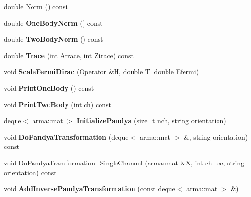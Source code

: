 \begin{DoxyCompactItemize}
\item 
double \hyperlink{classOperator_acb9d7959232a636191b91f6bf5b7b0c8}{Norm} () const 
\item 
double {\bfseries One\+Body\+Norm} () const \hypertarget{classOperator_a72dc7aea85c7775097d235de6f17f330}{}\label{classOperator_a72dc7aea85c7775097d235de6f17f330}

\item 
double {\bfseries Two\+Body\+Norm} () const \hypertarget{classOperator_af1c40bdef64ec9abd5d95e8328565a67}{}\label{classOperator_af1c40bdef64ec9abd5d95e8328565a67}

\item 
double {\bfseries Trace} (int Atrace, int Ztrace) const \hypertarget{classOperator_a349c80a3302de71eda14bae2e41e941e}{}\label{classOperator_a349c80a3302de71eda14bae2e41e941e}

\item 
void {\bfseries Scale\+Fermi\+Dirac} (\hyperlink{classOperator}{Operator} \&H, double T, double Efermi)\hypertarget{classOperator_a1dac4ba672e0c86f79320b28c210e9a5}{}\label{classOperator_a1dac4ba672e0c86f79320b28c210e9a5}

\item 
void {\bfseries Print\+One\+Body} () const \hypertarget{classOperator_a5ec5a8110337108ac31d3af7337e454b}{}\label{classOperator_a5ec5a8110337108ac31d3af7337e454b}

\item 
void {\bfseries Print\+Two\+Body} (int ch) const \hypertarget{classOperator_a905e42cefafaca0eb155cf41b3cd37b8}{}\label{classOperator_a905e42cefafaca0eb155cf41b3cd37b8}

\item 
deque$<$ arma\+::mat $>$ {\bfseries Initialize\+Pandya} (size\+\_\+t nch, string orientation)\hypertarget{classOperator_a26dab6abce8b9b8cad7d1c547d2ab396}{}\label{classOperator_a26dab6abce8b9b8cad7d1c547d2ab396}

\item 
void {\bfseries Do\+Pandya\+Transformation} (deque$<$ arma\+::mat $>$ \&, string orientation) const \hypertarget{classOperator_a90d693efa9c2a0c0a76d0c8f2fd424e5}{}\label{classOperator_a90d693efa9c2a0c0a76d0c8f2fd424e5}

\item 
void \hyperlink{classOperator_a40ea778ddd4c26666bdc15c463101d30}{Do\+Pandya\+Transformation\+\_\+\+Single\+Channel} (arma\+::mat \&X, int ch\+\_\+cc, string orientation) const 
\item 
void {\bfseries Add\+Inverse\+Pandya\+Transformation} (const deque$<$ arma\+::mat $>$ \&)\hypertarget{classOperator_a9208096420f56b1d302311b06a838535}{}\label{classOperator_a9208096420f56b1d302311b06a838535}


\end{DoxyCompactItemize}
